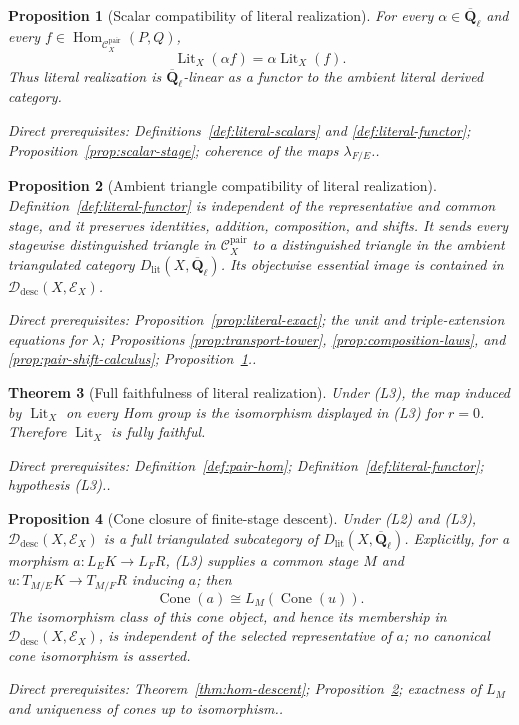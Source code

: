 \documentclass[10pt]{article}
\newtheorem{theorem}{Theorem}[section]
\newtheorem{proposition}[theorem]{Proposition}
\theoremstyle{definition}
\newcommand{\Qlb}{\overline{\mathbf Q}_\ell}
\newcommand{\Hom}{\operatorname{Hom}}
\newcommand{\Pair}{\mathcal C_X^{\mathrm{pair}}}
\newcommand{\depends}[1]{\par\smallskip\noindent\textit{Direct prerequisites:} #1.}
\begin{document}
\begin{proposition}[Scalar compatibility of literal realization]
\label{prop:literal-scalars}
For every $\alpha\in\Qlb$ and every $f\in\Hom_{\Pair}(P,Q)$,
\[
 \operatorname{Lit}_X(\alpha f)=
 \alpha\operatorname{Lit}_X(f).
\]
Thus literal realization is $\Qlb$-linear as a functor to the ambient
literal derived category.
\depends{Definitions~\ref{def:literal-scalars} and
\ref{def:literal-functor}; Proposition~\ref{prop:scalar-stage}; coherence
of the maps $\lambda_{F/E}$.}
\end{proposition}

\begin{proposition}[Ambient triangle compatibility of literal realization]
\label{prop:literal-functor}
Definition~\ref{def:literal-functor} is independent of the representative
and common stage, and it preserves identities, addition, composition,
and shifts.  It sends every stagewise distinguished triangle in $\Pair$ to
a distinguished triangle in the ambient triangulated category
$D_{\mathrm{lit}}(X,\Qlb)$.  Its objectwise essential image is contained in
$\mathcal D_{\mathrm{desc}}(X,\mathcal E_X)$.
\depends{Proposition~\ref{prop:literal-exact}; the unit and
triple-extension equations for $\lambda$; Propositions
\ref{prop:transport-tower}, \ref{prop:composition-laws}, and
\ref{prop:pair-shift-calculus}; Proposition~\ref{prop:literal-scalars}.}
\end{proposition}

\begin{theorem}[Full faithfulness of literal realization]
\label{thm:literal-fully-faithful}
Under (L3), the map induced by $\operatorname{Lit}_X$ on every Hom group is
the isomorphism displayed in (L3) for $r=0$.  Therefore
$\operatorname{Lit}_X$ is fully faithful.
\depends{Definition~\ref{def:pair-hom}; Definition~\ref{def:literal-functor};
hypothesis (L3).}
\end{theorem}

\begin{proposition}[Cone closure of finite-stage descent]
\label{prop:literal-cone-closure}
Under (L2) and (L3), $\mathcal D_{\mathrm{desc}}(X,\mathcal E_X)$ is a full
triangulated subcategory of $D_{\mathrm{lit}}(X,\Qlb)$.  Explicitly, for a
morphism $a:L_EK\to L_FR$, (L3) supplies a common stage $M$ and
$u:T_{M/E}K\to T_{M/F}R$ inducing $a$; then
\[
 \operatorname{Cone}(a)\cong L_M(\operatorname{Cone}(u)).
\]
The isomorphism class of this cone object, and hence its membership in
$\mathcal D_{\mathrm{desc}}(X,\mathcal E_X)$, is independent of the
selected representative of $a$; no canonical cone isomorphism is asserted.
\depends{Theorem~\ref{thm:hom-descent};
Proposition~\ref{prop:literal-functor}; exactness of $L_M$ and uniqueness of
cones up to isomorphism.}
\end{proposition}
\end{document}
